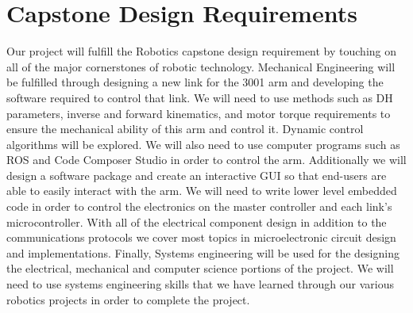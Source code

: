 \section{Capstone Design Requirements}
Our project will fulfill the Robotics capstone design requirement by touching on all of the major cornerstones of robotic technology. Mechanical Engineering will be fulfilled through designing a new link for the 3001 arm and developing the software required to control that link. We will need to use methods such as DH parameters, inverse and forward kinematics, and motor torque requirements to ensure the mechanical ability of this arm and control it. Dynamic control algorithms will be explored. We will also need to use computer programs such as ROS and Code Composer Studio in order to control the arm. Additionally we will design a software package and create an interactive GUI so that end-users are able to easily interact with the arm. We will need to write lower level embedded code in order to control the electronics on the master controller and each link's microcontroller. With all of the electrical component design in addition to the communications protocols we cover most topics in microelectronic circuit design and implementations. Finally, Systems engineering will be used for the designing the electrical, mechanical and computer science portions of the project. We will need to use systems engineering skills that we have learned through our various robotics projects in order to complete the project.
